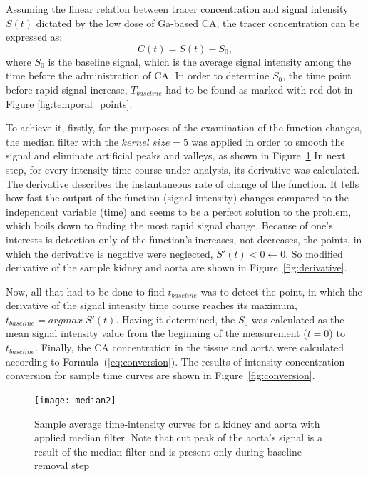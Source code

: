 Assuming the linear relation between tracer concentration and signal intensity $S(t)$ dictated by the low dose of Ga-based CA, the tracer concentration can be expressed as:
\begin{equation}
	\label{eq:conversion}
	C(t) = S(t)-S_0,
\end{equation}
where $S_0$ is the baseline signal, which is the average signal intensity among the time before the administration of CA. 
In order to determine $S_0$, the time point before rapid signal increase, $T_{baseline}$ had to be found  as marked with red dot in Figure \ref{fig:temporal_points}.

To achieve it, firstly, for the purposes of the examination of the function changes, the median filter  with the $kernel\;size = 5$ was applied in order to smooth the signal and eliminate artificial  peaks and valleys, as shown in Figure~\ref{fig:median}  
In next step, for every intensity time course under analysis, its derivative was calculated. The derivative describes the instantaneous rate of change of the function. It tells how fast the output of the function (signal intensity) changes compared to the independent variable (time) \cite{calculus} and seems to be a perfect solution to the problem, which boils down to finding the most rapid signal change. 
Because of one's interests is detection only of the function's increases, not decreases, the points, in which the derivative is negative were neglected, $S'(t)<0\leftarrow0$. So modified derivative of the sample kidney and aorta are shown in Figure~\ref{fig:derivative}.

Now, all that had to be done to find $t_{baseline}$ was to detect the point, in which the derivative of the signal intensity time course reaches its maximum, $t_{baseline}=argmax\;S'(t)$. Having it determined, the $S_0$ was calculated as the mean signal intensity value from the beginning of the measurement ($t=0$) to $t_{baseline}$. Finally, the CA concentration in the tissue and aorta were calculated according to Formula~(\ref{eq:conversion}). The results of intensity-concentration conversion for sample time curves are shown in Figure~\ref{fig:conversion}. 
\begin{figure}[H]
	\centering
	\texttt{[image: median2]}
\caption[Sample average time-intensity curves for a kidney and aorta with applied median filter]{Sample average time-intensity curves for a kidney and aorta with applied median filter. Note that cut peak of the aorta's signal is a result of the median filter and is present only during baseline removal step}
\label{fig:median}
\end{figure}

